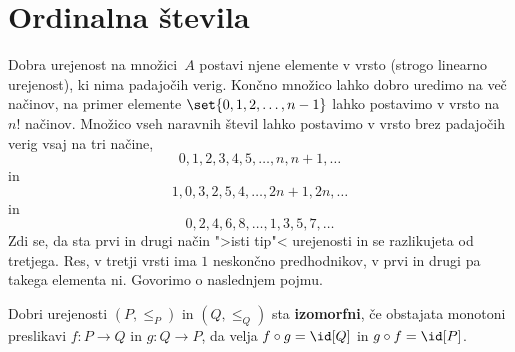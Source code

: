 \section{Ordinalna števila}
\label{sec:ordinalna-tevila}

Dobra urejenost na množici~$A$ postavi njene elemente v vrsto (strogo linearno urejenost), ki nima padajočih verig.
Končno množico lahko dobro uredimo na več načinov, na primer elemente $\set{0, 1, 2, \ldots, n-1}$ lahko postavimo v vrsto na $n!$ načinov. Množico vseh naravnih števil lahko postavimo v vrsto brez padajočih verig vsaj na tri načine,
%
\begin{equation*}
  0, 1, 2, 3, 4, 5, \ldots, n, n + 1, \ldots
\end{equation*}
%
in
%
\begin{equation*}
  1, 0, 3, 2, 5, 4, \ldots, 2 n + 1, 2 n, \ldots
\end{equation*}
%
in
%
\begin{equation*}
  0, 2, 4, 6, 8, \ldots, 1, 3, 5, 7, \ldots
\end{equation*}
%
Zdi se, da sta prvi in drugi način ">isti tip"< urejenosti in se razlikujeta od tretjega. Res, v tretji vrsti ima $1$ neskončno predhodnikov, v prvi in drugi pa takega elementa ni. Govorimo o naslednjem pojmu.

\begin{definicija}
  Dobri urejenosti $(P, {\leq_P})$ in $(Q, {\leq_Q})$ sta \textbf{izomorfni}, če obstajata monotoni preslikavi $f : P \to Q$ in $g : Q \to P$, da velja $f \circ g = \id[Q]$ in $g \circ f = \id[P]$.
\end{definicija}

